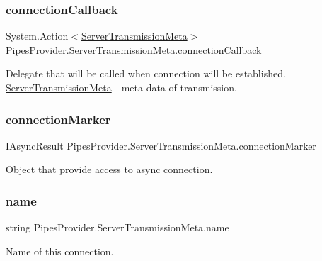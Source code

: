\subsubsection{\texorpdfstring{connection\+Callback}{connectionCallback}}
{\footnotesize\ttfamily System.\+Action$<$\mbox{\hyperlink{class_pipes_provider_1_1_server_transmission_meta}{Server\+Transmission\+Meta}}$>$ Pipes\+Provider.\+Server\+Transmission\+Meta.\+connection\+Callback}



Delegate that will be called when connection will be established. \mbox{\hyperlink{class_pipes_provider_1_1_server_transmission_meta}{Server\+Transmission\+Meta}} -\/ meta data of transmission. 

\mbox{\label{class_pipes_provider_1_1_server_transmission_meta_a1d4a87ad9a66bd81bc68f48fa28dbf32}} 
\subsubsection{\texorpdfstring{connection\+Marker}{connectionMarker}}
{\footnotesize\ttfamily I\+Async\+Result Pipes\+Provider.\+Server\+Transmission\+Meta.\+connection\+Marker}



Object that provide access to async connection. 

\mbox{\label{class_pipes_provider_1_1_server_transmission_meta_abed6acbaaf01392151667fad217ec7c3}} 
\subsubsection{\texorpdfstring{name}{name}}
{\footnotesize\ttfamily string Pipes\+Provider.\+Server\+Transmission\+Meta.\+name}



Name of this connection. 

